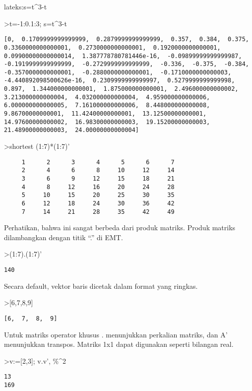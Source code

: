 \documentclass[
]{book}
\begin{document}
lateks:s=t\^{}3-t

\textgreater t=-1:0.1:3; s=t\^{}3-t

\begin{verbatim}
[0,  0.1709999999999999,  0.2879999999999999,  0.357,  0.384,  0.375,
0.3360000000000001,  0.2730000000000001,  0.1920000000000001,
0.09900000000000014,  1.387778780781446e-16,  -0.09899999999999987,
-0.1919999999999999,  -0.2729999999999999,  -0.336,  -0.375,  -0.384,
-0.3570000000000001,  -0.2880000000000001,  -0.1710000000000003,
-4.440892098500626e-16,  0.2309999999999997,  0.5279999999999998,
0.897,  1.344000000000001,  1.875000000000001,  2.496000000000002,
3.213000000000004,  4.032000000000004,  4.959000000000006,
6.000000000000005,  7.161000000000006,  8.448000000000008,
9.86700000000001,  11.42400000000001,  13.12500000000001,
14.97600000000002,  16.98300000000003,  19.15200000000003,
21.48900000000003,  24.00000000000004]
\end{verbatim}

\textgreater shortest (1:7)*(1:7)'

\begin{verbatim}
     1      2      3      4      5      6      7 
     2      4      6      8     10     12     14 
     3      6      9     12     15     18     21 
     4      8     12     16     20     24     28 
     5     10     15     20     25     30     35 
     6     12     18     24     30     36     42 
     7     14     21     28     35     42     49 
\end{verbatim}

Perhatikan, bahwa ini sangat berbeda dari produk matriks. Produk matriks dilambangkan dengan titik ``.'' di EMT.

\textgreater(1:7).(1:7)'

\begin{verbatim}
140
\end{verbatim}

Secara default, vektor baris dicetak dalam format yang ringkas.

\textgreater{[}6,7,8,9{]}

\begin{verbatim}
[6,  7,  8,  9]
\end{verbatim}

Untuk matriks operator khusus . menunjukkan perkalian matriks, dan A' menunjukkan transpos. Matriks 1x1 dapat digunakan seperti bilangan real.

\textgreater v:={[}2,3{]}; v.v', \%\^{}2

\begin{verbatim}
13
169
\end{verbatim}
\end{document}
